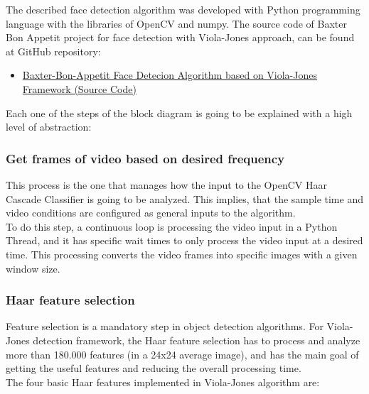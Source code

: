 \documentclass[11pt]{report} %
\begin{document}
The described face detection algorithm was developed with Python programming language with the libraries of OpenCV and numpy. The source code of Baxter Bon Appetit project for face detection with Viola-Jones approach, can be found at  GitHub repository:


\begin{itemize}
    \color{blue}
    \item \href{https://github.com/san99tiago/baxter-bon-appetit/tree/main/python/computer_vision/face_detect_haar_cascade}{Baxter-Bon-Appetit Face Detecion Algorithm based on Viola-Jones Framework (Source Code)}
\end{itemize}


Each one of the steps of the block diagram is going to be explained with a high level of abstraction:

\subsubsection{Get frames of video based on desired frequency}

This process is the one that manages how the input to the OpenCV Haar Cascade Classifier is going to be analyzed. This implies, that the sample time and video conditions are configured as general inputs to the algorithm.\\

To do this step, a continuous loop is processing the video input in a Python Thread, and it has specific wait times to only process the video input at a desired time. This processing converts the video frames into specific images with a given window size.\\

\subsubsection{Haar feature selection}

Feature selection is a mandatory step in object detection algorithms. For Viola-Jones detection framework, the Haar feature selection has to process and analyze more than 180.000 features (in a 24x24 average image), and has the main goal of getting the useful features and reducing the overall processing time.\\

The four basic Haar features implemented in Viola-Jones algorithm are:
\end{document}
